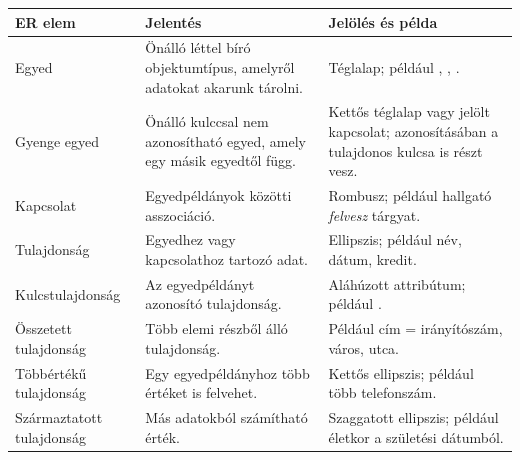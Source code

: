 \begin{tabularx}{\textwidth}{L{27mm}X X}
\toprule
\textbf{ER elem} & \textbf{Jelentés} & \textbf{Jelölés és példa} \\
\midrule
Egyed & Önálló léttel bíró objektumtípus, amelyről adatokat akarunk tárolni. & Téglalap; például , , . \\
Gyenge egyed & Önálló kulccsal nem azonosítható egyed, amely egy másik egyedtől függ. & Kettős téglalap vagy jelölt kapcsolat; azonosításában a tulajdonos kulcsa is részt vesz. \\
Kapcsolat & Egyedpéldányok közötti asszociáció. & Rombusz; például hallgató \emph{felvesz} tárgyat. \\
Tulajdonság & Egyedhez vagy kapcsolathoz tartozó adat. & Ellipszis; például név, dátum, kredit. \\
Kulcstulajdonság & Az egyedpéldányt azonosító tulajdonság. & Aláhúzott attribútum; például . \\
Összetett tulajdonság & Több elemi részből álló tulajdonság. & Például cím = irányítószám, város, utca. \\
Többértékű tulajdonság & Egy egyedpéldányhoz több értéket is felvehet. & Kettős ellipszis; például több telefonszám. \\
Származtatott tulajdonság & Más adatokból számítható érték. & Szaggatott ellipszis; például életkor a születési dátumból. \\
\bottomrule
\end{tabularx}
